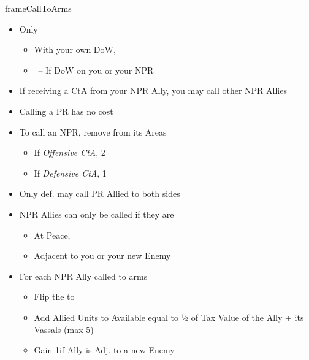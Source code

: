 \documentclass[10pt]{article}
\newlength{\fhCallToArms} \setlength\fhCallToArms{10\baselineskip}
\begin{document}
\begin{dynamiccontents*}{frameCallToArms}\begin{eubox}{\fhCallToArms}
	\begin{multicols}{2}
		\begin{itemize}
			\item Only
			\begin{itemize}
				\item With your own DoW, 
				\item \reaction~-- If DoW on you or your NPR \ally
			\end{itemize}
			\item If receiving a CtA from your NPR Ally, you may call other NPR Allies
			\item Calling a PR has no cost
			\item To call an NPR, remove \influence from its Areas
			\begin{itemize}
				\item If \emph{Offensive CtA}, 2\influence
				\item If \emph{Defensive CtA}, 1\influence
			\end{itemize}
			\item Only def. may call PR Allied to both sides
			\item NPR Allies can only be called if they are
			\begin{itemize}
				\item At Peace, 
				\item Adjacent to you or your new Enemy
			\end{itemize}
			\item For each NPR Ally called to arms
			\begin{itemize}
				\item Flip the \alliance to \activeally
				\item Add Allied Units to Available \manpower equal to ½ of Tax Value of the Ally + its Vassals (max 5)
				\item Gain 1\milpower if Ally is Adj. to a new Enemy
			\end{itemize}
		\end{itemize}
	\end{multicols}
\end{eubox}\end{dynamiccontents*}
\end{document}
